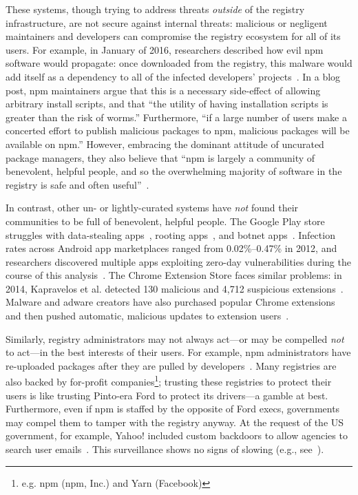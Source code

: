 These systems, though trying to address threats \emph{outside} of the registry
infrastructure, are not secure against internal threats: malicious or negligent
maintainers and developers can compromise the registry ecosystem for all of its users.
For example, in January of 2016, researchers described how evil npm software would
propagate: once downloaded from the registry, this malware would add itself as a dependency
to all of the infected developers' projects~\cite{npm-package-install}.
In a blog post, npm maintainers argue that this is a necessary side-effect of allowing arbitrary install
scripts, and that ``the utility of having installation scripts is greater than the risk of worms.'' 
Furthermore, ``if a large number of users make a concerted effort to publish
malicious packages to npm, malicious packages will be available on npm.'' However, embracing
the dominant attitude of uncurated package managers, they also believe that ``npm is
largely a community of benevolent, helpful people, and so the overwhelming majority of software
in the registry is safe and often useful''~\cite{npm-package-install}.

In contrast, other un- or lightly-curated systems have \emph{not} found their
communities to be full of benevolent, helpful people. The Google Play store
struggles with data-stealing apps~\cite{googleplay-spy}, rooting
apps~\cite{googleplay-root}, and botnet apps~\cite{googleplay-dresscode}.
Infection rates across Android app marketplaces ranged from 0.02\%--0.47\% in
2012, and researchers discovered multiple apps exploiting zero-day
vulnerabilities during the course of this analysis~\cite{zhou2012hey}.  The
Chrome Extension Store faces similar problems: in 2014, Kapravelos et al.
detected 130 malicious and 4,712 suspicious
extensions~\cite{kapravelos2014hulk}.  Malware and adware creators have also
purchased popular Chrome extensions and then pushed automatic, malicious
updates to extension users~\cite{chrome-sale}. 

Similarly, registry administrators may not always act---or may be compelled \emph{not} to
act---in the best interests of their users. For example, npm administrators
have re-uploaded packages after they are pulled by developers~\cite{leftpad}.
Many registries are also backed by for-profit
companies\footnote{e.g. npm (npm, Inc.) and Yarn (Facebook)}; trusting these registries
to protect their users is like trusting Pinto-era Ford to protect its drivers---a
gamble at best. Furthermore, even if npm is staffed by
the opposite of Ford execs, governments may compel them to tamper with the registry anyway.
At the request of the US government, for example, Yahoo! included custom backdoors to allow
agencies to search user emails~\cite{yahoo-backdoor}. This surveillance shows
no signs of slowing (e.g., see~\cite{trumptweet}). 

